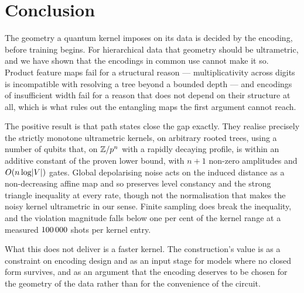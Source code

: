 \section{Conclusion}
\label{sec:conclusion}

The geometry a quantum kernel imposes on its data is decided by the encoding, before
training begins. For hierarchical data that geometry should be ultrametric, and we have
shown that the encodings in common use cannot make it so. Product feature maps fail for
a structural reason --- multiplicativity across digits is incompatible with resolving a
tree beyond a bounded depth --- and encodings of insufficient width fail for a reason
that does not depend on their structure at all, which is what rules out the entangling
maps the first argument cannot reach.

The positive result is that path states close the gap exactly. They realise precisely
the strictly monotone ultrametric kernels, on arbitrary rooted trees, using a number of
qubits that, on $\mathbb{Z}/p^{n}$ with a rapidly decaying profile, is within an additive constant
of the proven lower bound, with $n+1$ non-zero amplitudes and $O(n \log \lvert V\rvert)$
gates. Global depolarising noise acts on the induced distance as a non-decreasing affine map
and so preserves level constancy and the strong triangle inequality at every rate,
though not the normalisation that makes the noisy kernel ultrametric in our sense.
Finite sampling does break the inequality, and the violation magnitude falls below one
per cent of the kernel range at a measured $100\,000$ shots per kernel entry.

What this does not deliver is a faster kernel. The construction's value is as a
constraint on encoding design and as an input stage for models where no closed form
survives, and as an argument that the encoding deserves to be
chosen for the geometry of the data rather than for the convenience of the circuit.
